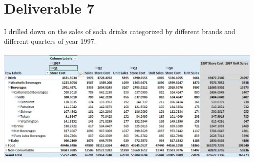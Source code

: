 \documentclass{article}
\begin{document}
\section{Deliverable 7}

I drilled down on the sales of soda drinks categorized by different brands and different quarters of year 1997.\\
\\
\noindent \includegraphics[scale=0.763]{deliverable7.jpg}
\end{document}
